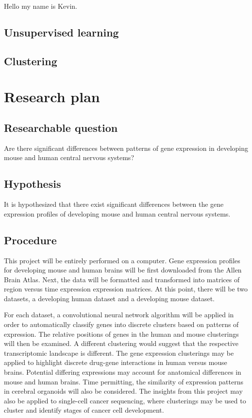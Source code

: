 \documentclass[12pt,oneside,onecolumn,a4paper]{article}
\begin{document}
Hello my name is Kevin.
\subsection{Unsupervised learning}


\subsection{Clustering}
\citep{yangCVPR2016joint}

\section{Research plan}


\subsection{Researchable question}
Are there significant differences between patterns of gene expression in developing mouse and human central nervous systems?

\subsection{Hypothesis}

It is hypothesized that there exist significant differences between the gene expression profiles of developing mouse and human central nervous systems.

\subsection{Procedure}
This project will be entirely performed on a computer. Gene expression profiles for developing mouse and human brains will be first downloaded from the Allen Brain Atlas. Next, the data will be formatted and transformed into matrices of region versus time expression expression matrices. At this point, there will be two datasets, a developing human dataset and a developing mouse dataset. 


For each dataset, a convolutional neural network algorithm will be applied in order to automatically classify genes into discrete clusters based on patterns of expression. The relative positions of genes in the human and mouse clusterings will then be examined. A different clustering would suggest that the respective transcriptomic landscape is different. The gene expression clusterings may be applied to highlight discrete drug-gene interactions in human versus mouse brains. Potential differing expressions may account for anatomical differences in mouse and human brains. Time permitting, the similarity of expression patterns in cerebral organoids will also be considered. The insights from this project may also be applied to single-cell cancer sequencing, where clusterings may be used to cluster and identify stages of cancer cell development.



\end{document}
